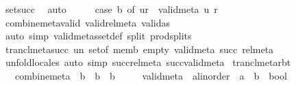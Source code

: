 \begin{isabellebody}
\ set{\isacharunderscore}{\kern0pt}succ\ \isamarkupfalse%
\ auto\isanewline
\ \ \isamarkupfalse%
\ \isamarkupfalse%
\ {\isachardoublequoteopen}case\ b\ of\ {\isacharparenleft}{\kern0pt}u{\isacharcomma}{\kern0pt}r{\isacharparenright}{\kern0pt}\ {\isasymRightarrow}\ valid{\isacharunderscore}{\kern0pt}meta\ u\ r{\isachardoublequoteclose}\ \isamarkupfalse%
\ combine{\isacharunderscore}{\kern0pt}meta{\isacharunderscore}{\kern0pt}valid\ valid{\isacharunderscore}{\kern0pt}rel{\isacharunderscore}{\kern0pt}meta\ valid{\isacharunderscore}{\kern0pt}as\ \isamarkupfalse%
\ {\isacharparenleft}{\kern0pt}auto\ simp{\isacharcolon}{\kern0pt}\ valid{\isacharunderscore}{\kern0pt}metas{\isacharunderscore}{\kern0pt}set{\isacharunderscore}{\kern0pt}def\ split{\isacharcolon}{\kern0pt}\ prod{\isachardot}{\kern0pt}splits{\isacharparenright}{\kern0pt}\isanewline
{}\isamarkupfalse%
%
\endisatagproof
{\isafoldproof}%
%
\isadelimproof
\isanewline
%
\endisadelimproof
\isanewline
{}\isamarkupfalse%
\ trancl{\isacharunderscore}{\kern0pt}meta{\isacharunderscore}{\kern0pt}succ\ un\ set{\isacharunderscore}{\kern0pt}of\ memb\ empty\ valid{\isacharunderscore}{\kern0pt}meta\ succ\ rel{\isacharunderscore}{\kern0pt}meta\isanewline
%
\isadelimproof
\ \ %
\endisadelimproof
%
\isatagproof
{}\isamarkupfalse%
\ unfold{\isacharunderscore}{\kern0pt}locales\ {\isacharparenleft}{\kern0pt}auto\ simp{\isacharcolon}{\kern0pt}\ succ{\isacharunderscore}{\kern0pt}rel{\isacharunderscore}{\kern0pt}meta\ succ{\isacharunderscore}{\kern0pt}valid{\isacharunderscore}{\kern0pt}meta{\isacharparenright}{\kern0pt}%
\endisatagproof
{\isafoldproof}%
%
\isadelimproof
\isanewline
%
\endisadelimproof
\isanewline
{}\isamarkupfalse%
\isanewline
\isanewline
{}\isamarkupfalse%
\ trancl{\isacharunderscore}{\kern0pt}meta{\isacharunderscore}{\kern0pt}rbt\ {\isacharequal}{\kern0pt}\isanewline
\ \ \ combine{\isacharunderscore}{\kern0pt}meta\ {\isacharcolon}{\kern0pt}{\isacharcolon}{\kern0pt}\ {\isachardoublequoteopen}{\isacharprime}{\kern0pt}b\ {\isasymRightarrow}\ {\isacharprime}{\kern0pt}b\ {\isasymRightarrow}\ {\isacharprime}{\kern0pt}b{\isachardoublequoteclose}\isanewline
\ \ \ \ \ valid{\isacharunderscore}{\kern0pt}meta\ {\isacharcolon}{\kern0pt}{\isacharcolon}{\kern0pt}\ {\isachardoublequoteopen}{\isacharparenleft}{\kern0pt}{\isacharparenleft}{\kern0pt}{\isacharprime}{\kern0pt}a{\isacharcolon}{\kern0pt}{\isacharcolon}{\kern0pt}linorder{\isacharparenright}{\kern0pt}\ {\isasymtimes}\ {\isacharprime}{\kern0pt}a{\isacharparenright}{\kern0pt}\ {\isasymRightarrow}\ {\isacharprime}{\kern0pt}b\ {\isasymRightarrow}\ bool{\isachardoublequoteclose}\isanewline

\end{isabellebody}
